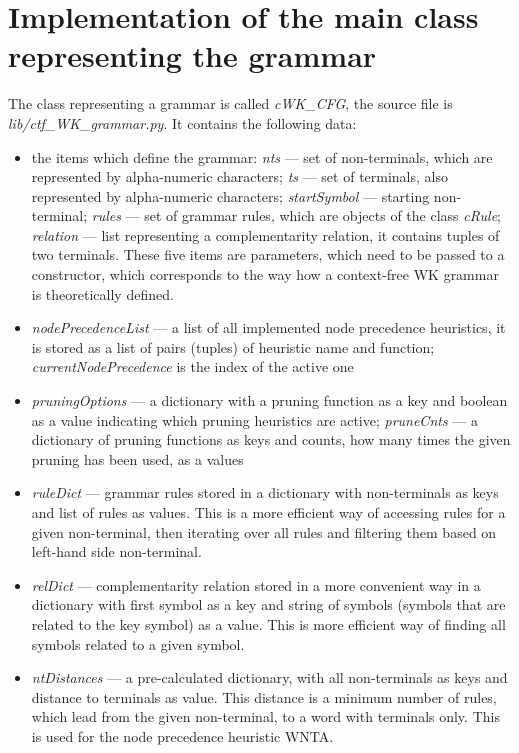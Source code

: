 \section{Implementation of the main class representing the grammar}
The class representing a grammar is called \textit{cWK\_CFG}, the source file is \textit{lib/ctf\_WK\_grammar.py}. It contains the following data:
\begin{itemize}
  \item{the items which define the grammar: \textit{nts} --- set of non-terminals, which are represented by alpha-numeric characters; \textit{ts} --- set of terminals, also represented by alpha-numeric characters; \textit{startSymbol} --- starting non-terminal; \textit{rules} --- set of grammar rules, which are objects of the class \textit{cRule}; \textit{relation} --- list representing a complementarity relation, it contains tuples of two terminals. These five items are parameters, which need to be passed to a constructor, which corresponds to the way how a context-free WK grammar is theoretically defined.}

  \item{\textit{nodePrecedenceList} --- a list of all implemented node precedence heuristics, it is stored as a list of pairs (tuples) of heuristic name and function; \textit{currentNodePrecedence} is the index of the active one}

  \item{\textit{pruningOptions} --- a dictionary with a pruning function as a key and boolean as a value indicating which pruning heuristics are active; \textit{pruneCnts} --- a dictionary of pruning functions as keys and counts, how many times the given pruning has been used, as a values}

  \item{\textit{ruleDict} --- grammar rules stored in a dictionary with non-terminals as keys and list of rules as values. This is a more efficient way of accessing rules for a given non-terminal, then iterating over all rules and filtering them based on left-hand side non-terminal.}

  \item{\textit{relDict} --- complementarity relation stored in a more convenient way in a dictionary with first symbol as a key and string of symbols (symbols that are related to the key symbol) as a value. This is more efficient way of finding all symbols related to a given symbol.}

  \item{\textit{ntDistances} --- a pre-calculated dictionary, with all non-terminals as keys and distance to terminals as value. This distance is a minimum number of rules, which lead from the given non-terminal, to a word with terminals only. This is used for the node precedence heuristic WNTA.}


\end{itemize}
